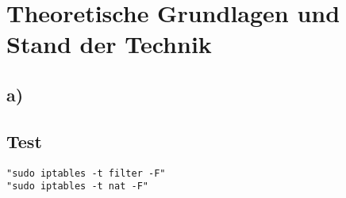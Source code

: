 \section{Theoretische Grundlagen und Stand der Technik}
\subsection*{a)}
%

\subsection{Test}

\begin{verbatim}
"sudo iptables -t filter -F"
"sudo iptables -t nat -F" 
\end{verbatim}\\

\newpage
